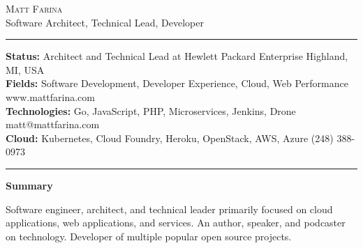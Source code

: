 \documentclass[10pt,A4]{article}
\newcommand{\cvsection}[1]
{
	\begin{center}
		\large\textcolor{sectcol}{\textbf{#1}}
	\end{center}
}
\newcommand{\metasection}[2]
{
\footnotesize{#2} \hspace*{\fill} \footnotesize{#1}\\[1pt]
}
\begin{document}
\pagestyle{fancy}	








\vspace{-8pt}
\begin{center}
	\HUGE \textsc{Matt Farina}\\[2pt]
	\small Software Architect, Technical Lead, Developer
\end{center}

\textcolor{sectcol}{\hrule}

\vspace{6pt}


\metasection{Highland, MI, USA}{\textbf{Status:} Architect and Technical Lead at Hewlett Packard Enterprise}
\metasection{www.mattfarina.com}{\textbf{Fields:} Software Development, Developer Experience, Cloud, Web Performance} 
\metasection{matt@mattfarina.com}{\textbf{Technologies:} Go, JavaScript, PHP, Microservices, Jenkins, Drone}
\metasection{(248) 388-0973}{\textbf{Cloud:} Kubernetes, Cloud Foundry, Heroku, OpenStack, AWS, Azure}
\vspace{-4pt}
\textcolor{sectcol}{\hrule}
\vspace{6pt}

\normalsize

\vspace{-6pt}
\cvsection{Summary}
Software engineer, architect, and technical leader primarily focused on cloud applications, web applications, and services. An author, speaker, and podcaster on technology. Developer of multiple popular open source projects.\
\end{document}
